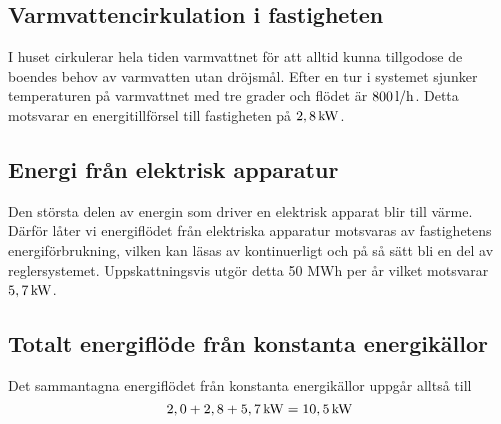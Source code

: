 \subsection{Varmvattencirkulation i fastigheten}
I huset cirkulerar hela tiden varmvattnet för att alltid kunna tillgodose de boendes behov av varmvatten utan dröjsmål. Efter en tur i systemet sjunker temperaturen på varmvattnet med tre grader och flödet är $\unit[800]{l/h}$. Detta motsvarar en energitillförsel till fastigheten på $\unit[2,8]{kW}$.

\subsection{Energi från elektrisk apparatur}
Den största delen av energin som driver en elektrisk apparat blir till värme. Därför låter vi energiflödet från elektriska apparatur motsvaras av fastighetens energiförbrukning, vilken kan läsas av kontinuerligt och på så sätt bli en del av reglersystemet. Uppskattningsvis utgör detta 50 MWh per år vilket motsvarar $\unit[5,7]{kW}$.

\subsection{Totalt energiflöde från konstanta energikällor}
Det sammantagna energiflödet från konstanta energikällor uppgår alltså till 
\begin{equation}
\unit[2,0+2,8+5,7]{kW} =\unit[10,5]{kW}
\end{equation}


